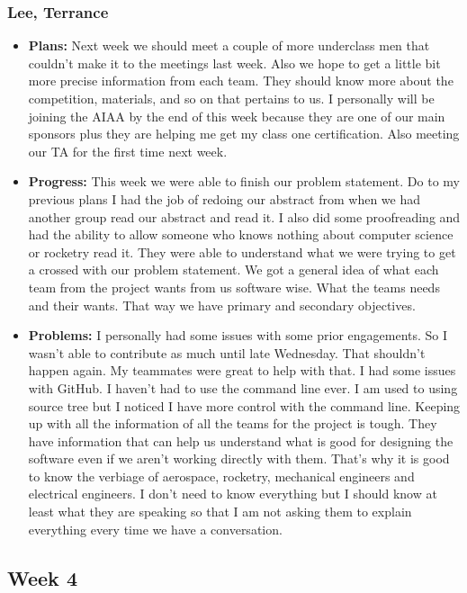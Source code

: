 \documentclass[10pt,draftclsnofoot,onecolumn]{IEEEtran}
\begin{document}
\subsubsection{Lee, Terrance}
\begin{itemize}
	\item \textbf{Plans: }Next week we should meet a couple of more underclass men that couldn't make it to the meetings last week. Also we hope to get a little bit more precise information from each team. They should know more about the competition, materials, and so on that pertains to us. I personally will be joining the AIAA by the end of this week because they are one of our main sponsors plus they are helping me get my class one certification. Also meeting our TA for the first time next week.
	\item \textbf{Progress: }This week we were able to finish our problem statement. Do to my previous plans I had the job of redoing our abstract from when we had another group read our abstract and read it. I also did some proofreading and had the ability to allow someone who knows nothing about computer science or rocketry read it. They were able to understand what we were trying to get a crossed with our problem statement. We got a general idea of what each team from the project wants from us software wise. What the teams needs and their wants. That way we have primary and secondary objectives.
	\item \textbf{Problems: }I personally had some issues with some prior engagements. So I wasn't able to contribute as much until late Wednesday. That shouldn't happen again. My teammates were great to help with that. I had some issues with GitHub. I haven't had to use the command line ever. I am used to using source tree but I noticed I have more control with the command line. Keeping up with all the information of all the teams for the project is tough. They have information that can help us understand what is good for designing the software even if we aren't working directly with them. That's why it is good to know the verbiage of aerospace, rocketry, mechanical engineers and electrical engineers. I don't need to know everything but I should know at least what they are speaking so that I am not asking them to explain everything every time we have a conversation.
\end{itemize}
\subsection{Week 4}
\end{document}
